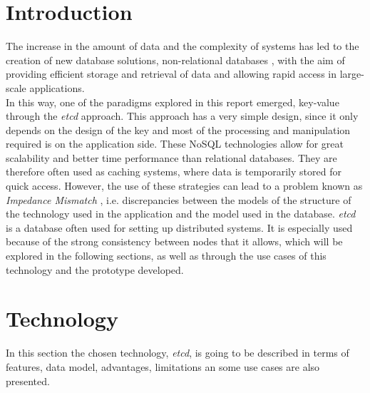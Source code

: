 \documentclass[screen,review]{acmart}
\begin{document}
\section{Introduction}
The increase in the amount of data and the complexity of systems has led to the creation of new database solutions, non-relational databases \cite{nosql}, with the aim of providing efficient storage and retrieval of data and allowing rapid access in large-scale applications. \\
In this way, one of the paradigms explored in this report emerged, key-value through the \textit{etcd} \cite{etcd} approach.
This approach has a very simple design, since it only depends on the design of the key and most of the processing and manipulation required is on the application side. These NoSQL technologies allow for great scalability and better time performance than relational databases. They are therefore often used as caching systems, where data is temporarily stored for quick access. However, the use of these strategies can lead to a problem known as \textit{Impedance Mismatch} \cite{impedance}, i.e. discrepancies between the models of the structure of the technology used in the application and the model used in the database.
\textit{etcd}  is a database often used for setting up distributed systems. It is especially used because of the strong consistency between nodes that it allows, which will be explored in the following sections, as well as through the use cases of this technology and the prototype developed.
    
    
\section{Technology}
In this section the chosen technology, \textit{etcd}, is going to be described in terms of features, data model, advantages, limitations an some use cases are also presented.
\end{document}
